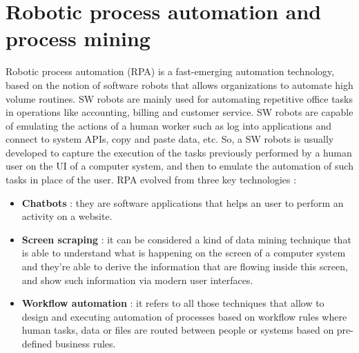 \documentclass[11pt]{article}
\begin{document}
\section{Robotic process automation and process mining}
Robotic process automation (RPA) is a fast-emerging automation technology, based on the notion of software robots that allows organizations to automate high volume routines. SW robots are mainly used for automating repetitive office tasks in operations like accounting, billing and customer service. SW robots are capable of emulating the actions of a human worker such as log into applications and connect to system APIs, copy and paste data, etc. So, a SW robots is usually developed to capture the execution of the tasks previously performed by a human user on the UI of a computer system, and then to emulate the automation of such tasks in place of the user. RPA evolved from three key technologies :
\begin{itemize}
\item \textbf{Chatbots} : they are software applications that helps an user to perform an activity on a website.

\item \textbf{Screen scraping} : it can be considered a kind of data mining technique that is able to understand what is happening on the screen of a computer system and they're able to derive the information that are flowing inside this screen, and show such information via modern user interfaces.

\item \textbf{Workflow automation} : it refers to all those techniques that allow to design and executing automation of processes based on workflow rules where human tasks, data or files are routed between people or systems based on pre-defined business rules.
\end{itemize}
\end{document}
